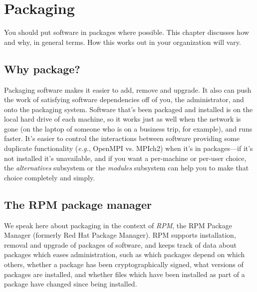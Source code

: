\chapter{Packaging}
\label{Packaging}

You should put software in packages where possible. This chapter discusses
how and why, in general terms. How this works out in your organization
will vary.



\section{Why package?}

Packaging software makes it easier to add, remove and upgrade. It also can
push the work of satisfying software dependencies off of you, the
administrator, and onto the packaging system. Software that's been
packaged and installed is on the local hard drive of each machine, so it
works just as well when the network is gone (on the laptop of someone who
is on a business trip, for example), and runs faster. It's easier to
control the interactions between software providing some duplicate
functionality (\emph{e.g.}, OpenMPI vs.  MPIch2) when it's in
packages---if it's not installed it's unavailable, and if you want a
per-machine or per-user choice, the \emph{alternatives} subsystem or the
\emph{modules} subsystem can help you to make that choice completely and
simply.



\section{The RPM package manager}

We speak here about packaging in the context of \emph{RPM}, the RPM
Package Manager (formerly Red Hat Package Manager). RPM supports
installation, removal and upgrade of packages of software, and keeps track
of data about packages which eases administration, such as which packages
depend on which others, whether a package has been cryptographically
signed, what versions of packages are installed, and whether files which
have been installed as part of a package have changed since being
installed.

